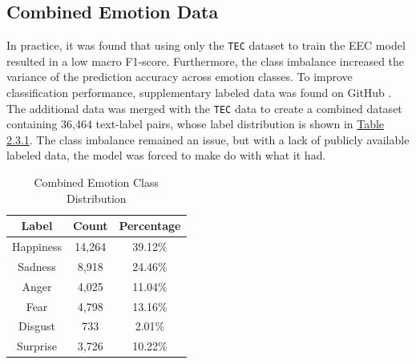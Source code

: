 \documentclass[11pt]{article}
\begin{document}
\subsection{Combined Emotion Data}
In practice, it was found that using only the \texttt{TEC} dataset to train the EEC model resulted in a low macro F1-score. Furthermore, the class imbalance increased the variance of the prediction accuracy across emotion classes. To improve classification performance, supplementary labeled data was found on GitHub \cite{Valente}. The additional data was merged with the \texttt{TEC} data to create a combined dataset containing 36,464 text-label pairs, whose label distribution is shown in \hyperref[tab:combined_emotion_label_distribution]{Table 2.3.1}. The class imbalance remained an issue, but with a lack of publicly available labeled data, the model was forced to make do with what it had.
\renewcommand{\thetable}{2.3.1}
\begin{table}[h]
    	\centering
    	\begin{tabular}{c c c}
        		\toprule
        		\textbf{Label} & \textbf{Count} & \textbf{Percentage} \\
        		\midrule
        		Happiness & 14,264 & 39.12\% \\
        		Sadness & 8,918 & 24.46\% \\
        		Anger & 4,025 & 11.04\% \\
        		Fear & 4,798 & 13.16\% \\
        		Disgust & 733 & 2.01\% \\
        		Surprise & 3,726 & 10.22\% \\
        		\bottomrule
    	\end{tabular}
    	\caption{Combined Emotion Class Distribution}
	\label{tab:combined_emotion_label_distribution}
\end{table}
\end{document}
